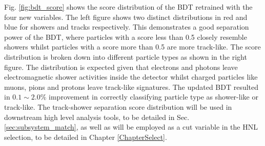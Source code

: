 Fig. \ref{fig:bdt_score} shows the score distribution of the BDT retrained with the four new variables.
The left figure shows two distinct distributions in red and blue for showers and tracks respectively.
This demonstrates a good separation power of the BDT, where particles with a score less than 0.5 closely resemble showers whilst particles with a score more than 0.5 are more track-like.
The score distribution is broken down into different particle types as shown in the right figure.
The distribution is expected given that electrons and photons leave electromagnetic shower activities inside the detector whilst charged particles like muons, pions and protons leave track-like signatures. 
The updated BDT resulted in $0.1\sim2.0\%$ improvement in correctly classifying particle type as shower-like or track-like.
The track-shower separation score distribution will be used in downstream high level analysis tools, to be detailed in Sec. \ref{sec:subsystem_match}, as well as will be employed as a cut variable in the HNL selection, to be detailed in Chapter \ref{ChapterSelect}.

